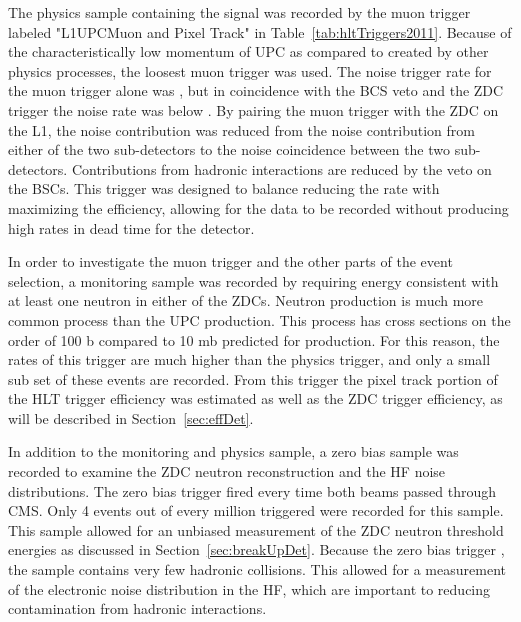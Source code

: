 {      The physics sample containing the \JPsi{} signal was recorded by the muon 
        trigger labeled "L1UPCMuon and Pixel Track" in 
        Table~\ref{tab:hltTriggers2011}. 
      Because of the characteristically low momentum of UPC \JPsi{} as compared
        to \JPsi{} created by other physics processes, the loosest muon 
        trigger was used.
      The noise trigger rate for the muon trigger alone was \DIFdelbegin {}\DIFdelend \DIFaddbegin {}\DIFaddend , but in 
        coincidence with the BCS veto and the ZDC trigger the noise rate was
        below \DIFdelbegin {}\DIFdelend \DIFaddbegin {}\DIFaddend . 
      By pairing the muon trigger with the ZDC on the L1, the noise contribution
        was reduced from the noise contribution from either of the two 
        sub-detectors to the noise coincidence between the two sub-detectors. 
      Contributions from hadronic interactions are reduced by the veto on the 
        BSCs.
      This trigger was designed to balance reducing the rate with maximizing 
        the efficiency, allowing for the data to be recorded without 
        producing high rates \DIFdelbegin {}\DIFdelend \DIFaddbegin {}\DIFaddend in dead time for the 
        detector.  

      In order to investigate the muon trigger and the other parts of the event 
        selection, a monitoring sample was recorded by requiring energy 
        consistent with at least one neutron in either of the ZDCs.
      Neutron production is \DIFaddbegin {}\DIFaddend much more common process than the UPC \JPsi{} 
        production.
      This process has cross sections on the order of 100 b compared
        to 10 mb predicted for \JPsi{} production. 
      For this reason, the rates of this trigger are much higher than the physics
        trigger, and only a small sub set of these events are recorded.
      From this trigger the pixel track portion of the HLT trigger efficiency 
        was estimated as well as the ZDC trigger efficiency, as will be described 
        in Section~\ref{sec:effDet}. 

      In addition to the monitoring and physics sample, a zero bias sample was 
        recorded to examine the ZDC neutron reconstruction and the HF noise 
        distributions. 
      The zero bias trigger fired every time both beams passed through CMS. 
      Only 4 events out of every million triggered were recorded for this sample. 
      This sample allowed for an unbiased measurement of the ZDC neutron 
        threshold energies as discussed in Section~\ref{sec:breakUpDet}. 
      Because the zero bias trigger \DIFdelbegin {}\DIFdelend \DIFaddbegin {}\DIFaddend , the sample contains very few hadronic collisions. 
      This allowed for a measurement of the electronic noise distribution in
        the HF, which are important to reducing contamination from hadronic
        interactions.

}
